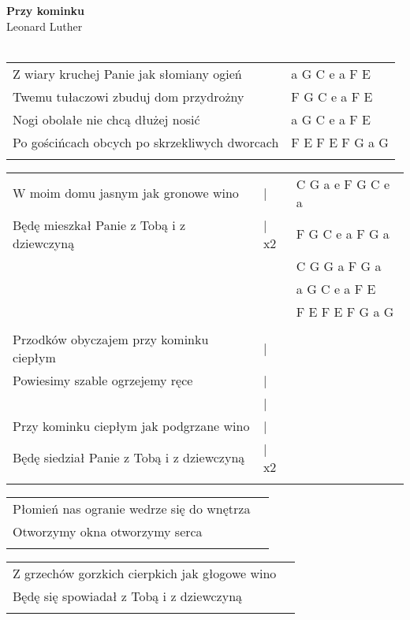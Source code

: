 \documentclass[a5paper]{article}
\begin{document}


\noindent
\fontsize{12pt}{15pt}\selectfont
\textbf{Przy kominku} \\
\fontsize{8pt}{10pt}\selectfont
Leonard Luther \\ \\
\fontsize{10pt}{12pt}\selectfont
{}
\begin{tabular}{@{}p{8.5cm}p{4cm}@{}}
\noindent
Z wiary kruchej Panie jak słomiany ogień & a G C e a F E \\
Twemu tułaczowi zbuduj dom przydrożny & F G C e a F E \\
Nogi obolałe nie chcą dłużej nosić & a G C e a F E \\
Po gościńcach obcych po skrzekliwych dworcach & F E F E F G a G \\ \\
\end{tabular}

\noindent
\begin{tabular}{@{}p{6.7cm}p{0.7cm}p{4cm}@{}}
	W moim domu jasnym jak gronowe wino       &|& C G a e F G C e a \\
	Będę mieszkał Panie z Tobą i z dziewczyną &| x2& F G C e a F G a \\
												& & C G G a F G a \\
			& & a G C e a F E \\
   & & F E F E F G a G \\ \\

	Przodków obyczajem przy kominku ciepłym   &|&  \\
	Powiesimy szable ogrzejemy ręce           &|& \\
											 & | & \\
	Przy kominku ciepłym jak podgrzane wino   &| & \\
	Będę siedział Panie z Tobą i z dziewczyną &| x2 \\ \\ 
\end{tabular}

\noindent
\begin{tabular}{@{}p{8.5cm}p{3cm}@{}}
Płomień nas ogranie wedrze się do wnętrza \\
Otworzymy okna otworzymy serca \\ \\
\end{tabular}

\noindent
\begin{tabular}{@{}p{8.5cm}p{3cm}@{}}
Z grzechów gorzkich cierpkich jak głogowe wino \\
Będę się spowiadał z Tobą i z dziewczyną \\ \\
\end{tabular}
\end{document}
